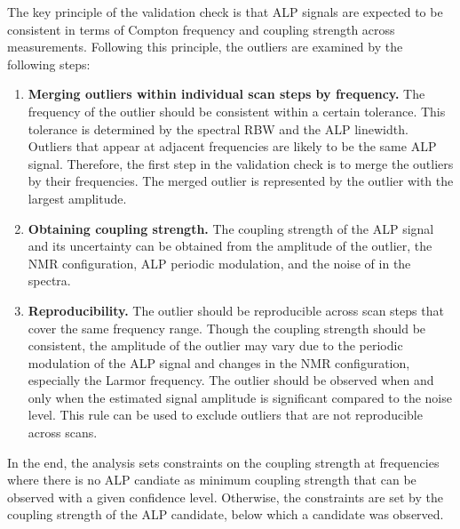 The key principle of the validation check is that ALP signals are expected to be consistent in terms of Compton frequency and coupling strength across measurements. 
Following this principle, the outliers are examined by the following steps:
\begin{enumerate}[label=\arabic*.]
    \item \textbf{Merging outliers within individual scan steps by frequency.} The frequency of the outlier should be consistent within a certain tolerance. This tolerance is determined by the spectral RBW and the ALP linewidth. Outliers that appear at adjacent frequencies are likely to be the same ALP signal. Therefore, the first step in the validation check is to merge the outliers by their frequencies. The merged outlier is represented by the outlier with the largest amplitude. 
    \item \textbf{Obtaining coupling strength.} The coupling strength of the ALP signal and its uncertainty can be obtained from the amplitude of the outlier, the NMR configuration, ALP periodic modulation, and the noise of in the spectra. 
    \item \textbf{Reproducibility.} The outlier should be reproducible across scan steps that cover the same frequency range. Though the coupling strength should be consistent, the amplitude of the outlier may vary due to the periodic modulation of the ALP signal and changes in the NMR configuration, especially the Larmor frequency. The outlier should be observed when and only when the estimated signal amplitude is significant compared to the noise level. This rule can be used to exclude outliers that are not reproducible across scans.  
\end{enumerate}
In the end, the analysis sets constraints on the coupling strength at frequencies where there is no ALP candiate as minimum coupling strength that can be observed with a given confidence level.
Otherwise, the constraints are set by the coupling strength of the ALP candidate, below which a candidate was observed. 


